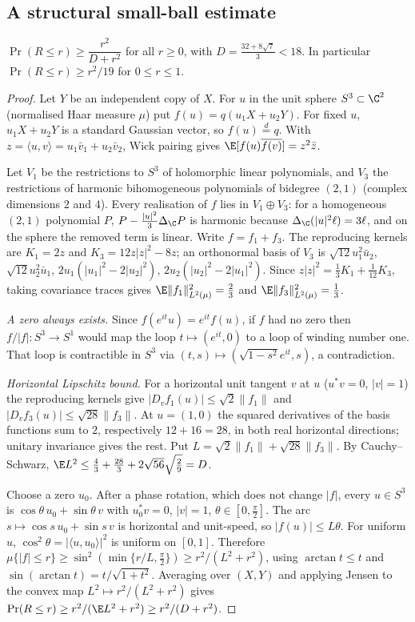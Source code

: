 \subsection{A structural small-ball estimate}
\begin{lemma}[\st{P}]\label{lem:l1l2-smallball}
$\Pr(R\le r)\ge\dfrac{r^2}{D+r^2}$ for all $r\ge0$, with $D=\frac{32+8\sqrt7}3<18$. In particular $\Pr(R\le r)\ge r^2/19$ for $0\le r\le1$.
\end{lemma}
\begin{proof}
Let $Y$ be an independent copy of $X$. For $u$ in the unit sphere $S^3\subset\C^2$ (normalised Haar measure $\mu$) put $f(u)=q(u_1X+u_2Y)$. For
fixed $u$, $u_1X+u_2Y$ is a standard Gaussian vector, so $f(u)\overset d=q$. With $z=\langle u,v\rangle=u_1\bar v_1+u_2\bar v_2$, Wick pairing gives
$\E[f(u)\overline{f(v)}]=z^2\bar z$.

Let $V_1$ be the restrictions to $S^3$ of holomorphic linear polynomials, and $V_3$ the restrictions of harmonic bihomogeneous polynomials of bidegree
$(2,1)$ (complex dimensions $2$ and $4$). Every realisation of $f$ lies in $V_1\oplus V_3$: for a homogeneous $(2,1)$ polynomial $P$,
$P-\frac{|u|^2}3\Delta_\C P$ is harmonic because $\Delta_\C(|u|^2\ell)=3\ell$, and on the sphere the removed term is linear. Write $f=f_1+f_3$. The
reproducing kernels are $K_1=2z$ and $K_3=12z|z|^2-8z$; an orthonormal basis of $V_3$ is $\sqrt{12}u_1^2\bar u_2$, $\sqrt{12}u_2^2\bar u_1$,
$2u_1(|u_1|^2-2|u_2|^2)$, $2u_2(|u_2|^2-2|u_1|^2)$. Since $z|z|^2=\frac13K_1+\frac1{12}K_3$, taking covariance traces gives
$\E\|f_1\|_{L^2(\mu)}^2=\frac23$ and $\E\|f_3\|_{L^2(\mu)}^2=\frac13$.

\emph{A zero always exists.} Since $f(e^{it}u)=e^{it}f(u)$, if $f$ had no zero then $f/|f|:S^3\to S^1$ would map the loop $t\mapsto(e^{it},0)$ to a
loop of winding number one. That loop is contractible in $S^3$ via $(t,s)\mapsto(\sqrt{1-s^2}e^{it},s)$, a contradiction.

\emph{Horizontal Lipschitz bound.} For a horizontal unit tangent $v$ at $u$ ($u^*v=0$, $|v|=1$) the reproducing kernels give
$|D_vf_1(u)|\le\sqrt2\|f_1\|$ and $|D_vf_3(u)|\le\sqrt{28}\|f_3\|$. At $u=(1,0)$ the squared derivatives of the basis functions sum to $2$, respectively
$12+16=28$, in both real horizontal directions; unitary invariance gives the rest. Put $L=\sqrt2\|f_1\|+\sqrt{28}\|f_3\|$. By Cauchy--Schwarz,
$\E L^2\le\frac43+\frac{28}3+2\sqrt{56}\sqrt{\frac29}=D$.

Choose a zero $u_0$. After a phase rotation, which does not change $|f|$, every $u\in S^3$ is $\cos\theta\,u_0+\sin\theta\,v$ with $u_0^*v=0$,
$|v|=1$, $\theta\in[0,\frac\pi2]$. The arc $s\mapsto\cos s\,u_0+\sin s\,v$ is horizontal and unit-speed, so $|f(u)|\le L\theta$. For uniform $u$,
$\cos^2\theta=|\langle u,u_0\rangle|^2$ is uniform on $[0,1]$. Therefore
$\mu\{|f|\le r\}\ge\sin^2(\min\{r/L,\frac\pi2\})\ge r^2/(L^2+r^2)$, using $\arctan t\le t$ and $\sin(\arctan t)=t/\sqrt{1+t^2}$. Averaging over
$(X,Y)$ and applying Jensen to the convex map $L^2\mapsto r^2/(L^2+r^2)$ gives $\Pr(R\le r)\ge r^2/(\E L^2+r^2)\ge r^2/(D+r^2)$.
\end{proof}


